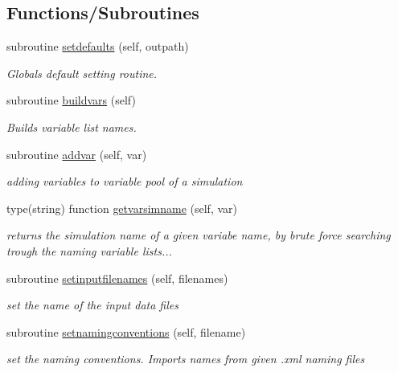 \subsection*{Functions/\+Subroutines}
\begin{DoxyCompactItemize}
\item 
subroutine \mbox{\hyperlink{namespacesimulationglobals__mod_aa01e0a958ef2e94a02991dcfe390bfa0}{setdefaults}} (self, outpath)
\begin{DoxyCompactList}\small\item\em Globals default setting routine. \end{DoxyCompactList}\item 
subroutine \mbox{\hyperlink{namespacesimulationglobals__mod_a4aa829af1699c705e46f47bb023ac162}{buildvars}} (self)
\begin{DoxyCompactList}\small\item\em Builds variable list names. \end{DoxyCompactList}\item 
subroutine \mbox{\hyperlink{namespacesimulationglobals__mod_afd372c5764a180f9029d4dc3cddce94d}{addvar}} (self, var)
\begin{DoxyCompactList}\small\item\em adding variables to variable pool of a simulation \end{DoxyCompactList}\item 
type(string) function \mbox{\hyperlink{namespacesimulationglobals__mod_ac83c53dd4e998e653981c7b1fa5dacbd}{getvarsimname}} (self, var)
\begin{DoxyCompactList}\small\item\em returns the simulation name of a given variabe name, by brute force searching trough the naming variable lists... \end{DoxyCompactList}\item 
subroutine \mbox{\hyperlink{namespacesimulationglobals__mod_a422e3d203aad010489f541f645f63517}{setinputfilenames}} (self, filenames)
\begin{DoxyCompactList}\small\item\em set the name of the input data files \end{DoxyCompactList}\item 
subroutine \mbox{\hyperlink{namespacesimulationglobals__mod_affd52c4c7b1c3f7ce282eeb7e4b4a359}{setnamingconventions}} (self, filename)
\begin{DoxyCompactList}\small\item\em set the naming conventions. Imports names from given .xml naming files \end{DoxyCompactList}\item 

\end{DoxyCompactItemize}

